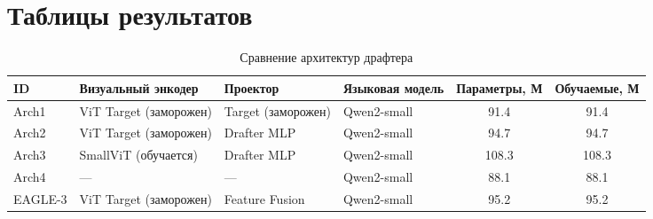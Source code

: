 \documentclass[12pt, a4paper]{article}
\begin{document}
\section*{Таблицы результатов}

\begin{table}[h]
\centering
\caption{Сравнение архитектур драфтера}
\label{tab:architectures}
\renewcommand{\arraystretch}{1.35}
\begin{tabular}{
  l
  l
  l
  l
  S[table-format=3.1]
  S[table-format=2.1]
}
\toprule
\textbf{ID} &
\textbf{Визуальный энкодер} &
\textbf{Проектор} &
\textbf{Языковая модель} &
{\textbf{Параметры, М}} &
{\textbf{Обучаемые, М}} \\
\midrule
Arch1  & ViT Target (заморожен)  & Target (заморожен)  & Qwen2-small & 91.4  & 91.4  \\
Arch2  & ViT Target (заморожен)  & Drafter MLP         & Qwen2-small & 94.7  & 94.7  \\
Arch3  & SmallViT (обучается)    & Drafter MLP         & Qwen2-small & 108.3 & 108.3 \\
Arch4  & —                       & —                   & Qwen2-small & 88.1  & 88.1  \\
EAGLE-3 & ViT Target (заморожен) & Feature Fusion     & Qwen2-small & 95.2  & 95.2  \\
\bottomrule
\end{tabular}
\end{table}
\end{document}
